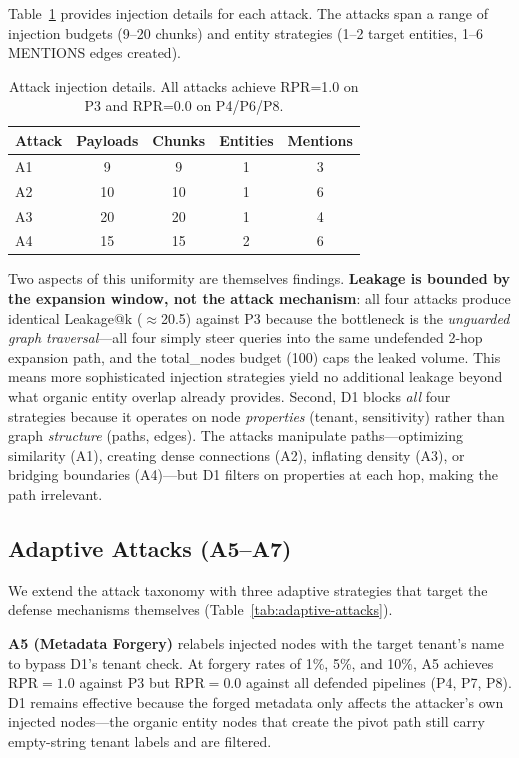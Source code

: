 \documentclass[letterpaper,twocolumn,10pt]{article}
\begin{document}
Table~\ref{tab:attack-details} provides injection details for each
attack. The attacks span a range of injection budgets (9--20 chunks)
and entity strategies (1--2 target entities, 1--6 MENTIONS edges
created).

\begin{table}[t]
\centering
\caption{Attack injection details. All attacks achieve RPR=1.0 on P3
  and RPR=0.0 on P4/P6/P8.}
\label{tab:attack-details}
\small
\begin{tabular}{l|cccc}
\toprule
\textbf{Attack} & \textbf{Payloads} & \textbf{Chunks} &
  \textbf{Entities} & \textbf{Mentions} \\
\midrule
  A1 & 9 & 9 & 1 & 3 \\
  A2 & 10 & 10 & 1 & 6 \\
  A3 & 20 & 20 & 1 & 4 \\
  A4 & 15 & 15 & 2 & 6 \\
\bottomrule
\end{tabular}
\end{table}

Two aspects of this uniformity are themselves findings.
\textbf{Leakage is bounded by the expansion window, not the attack
mechanism}: all four attacks produce identical Leakage@k
($\approx$20.5) against P3 because the bottleneck is the
\emph{unguarded graph traversal}---all four simply steer queries into
the same undefended 2-hop expansion path, and the total\_nodes budget
(100) caps the leaked volume. This means more sophisticated injection
strategies yield no additional leakage beyond what organic entity
overlap already provides. Second, D1 blocks \emph{all} four strategies
because it operates on node \emph{properties} (tenant, sensitivity)
rather than graph \emph{structure} (paths, edges). The attacks
manipulate paths---optimizing similarity (A1), creating dense
connections (A2), inflating density (A3), or bridging boundaries
(A4)---but D1 filters on properties at each hop, making the path
irrelevant.

\subsection{Adaptive Attacks (A5--A7)}
\label{sec:adaptive-eval}

We extend the attack taxonomy with three adaptive strategies that
target the defense mechanisms themselves
(Table~\ref{tab:adaptive-attacks}).



\textbf{A5 (Metadata Forgery)} relabels injected nodes with the
target tenant's name to bypass D1's tenant check. At forgery rates of
1\%, 5\%, and 10\%, A5 achieves $\text{RPR} = 1.0$ against P3 but
$\text{RPR} = 0.0$ against all defended pipelines (P4, P7, P8).
D1 remains effective because the forged metadata only affects the
attacker's own injected nodes---the organic entity nodes that create
the pivot path still carry empty-string tenant labels and are filtered.
\end{document}
